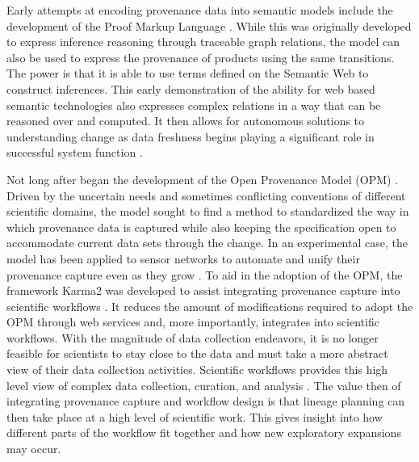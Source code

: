 Early attempts at encoding provenance data into semantic models include the development of the Proof Markup Language \cite{daSilva2006381}.
While this was originally developed to express inference reasoning through traceable graph relations, the model can also be used to express the provenance of products using the same transitions.
The power is that it is able to use terms defined on the Semantic Web to construct inferences.
This early demonstration of the ability for web based semantic technologies also expresses complex relations in a way that can be reasoned over and computed.
It then allows for autonomous solutions to understanding change as data freshness begins playing a significant role in successful system function \cite{Bouzeghoub:2004:FAD:1012453.1012464}.

Not long after began the development of the Open Provenance Model (OPM) \cite{moreau2008open}.
Driven by the uncertain needs and sometimes conflicting conventions of different scientific domains, the model sought to find a method to standardized the way in which provenance data is captured while also keeping the specification open to accommodate current data sets through the change.
In an experimental case, the model has been applied to sensor networks to automate and unify their provenance capture even as they grow \cite{5478496}.
To aid in the adoption of the OPM, the framework Karma2 was developed to assist integrating provenance capture into scientific workflows \cite{simmhan2010karma2}.
It reduces the amount of modifications required to adopt the OPM through web services and, more importantly, integrates into scientific workflows.
With the magnitude of data collection endeavors, it is no longer feasible for scientists to stay close to the data and must take a more abstract view of their data collection activities.
Scientific workflows provides this high level view of complex data collection, curation, and analysis \cite{Casati1996}.
The value then of integrating provenance capture and workflow design is that lineage planning can then take place at a high level of scientific work.
This gives insight into how different parts of the workflow fit together and how new exploratory expansions may occur.

